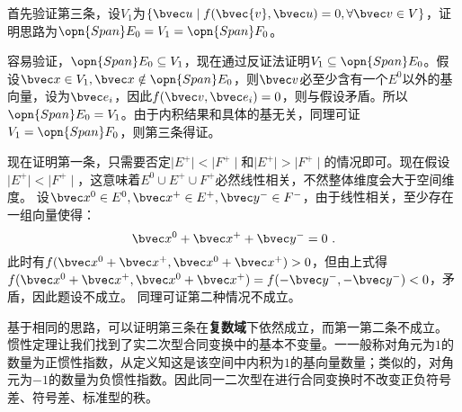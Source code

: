 首先验证第三条，设$V_1$为$\{\bvec u\mid f(\bvec{v},\bvec u)=0,\forall \bvec v\in V\}$，证明思路为$\opn{Span}E_0=V_1=\opn{Span}F_0$。

容易验证，$\opn{Span}E_0\subseteq V_1$，现在通过反证法证明$ V_1\subseteq \opn{Span}E_0$。假设$\bvec x\in V_1,\bvec x\notin \opn{Span}E_0$，则$\bvec v$必至少含有一个$E^0$以外的基向量，设为$\bvec e_i$，因此$f(\bvec v,\bvec e_i)=0$，则与假设矛盾。所以$\opn{Span}E_0=V_1$。由于内积结果和具体的基无关，同理可证$V_1=\opn{Span}F_0$，则第三条得证。

现在证明第一条，只需要否定$\mid E^{+}\mid<\mid F^{+}\mid$和$\mid E^{+}\mid>\mid F^{+}\mid$的情况即可。现在假设$\mid E^{+}\mid<\mid F^{+}\mid$，这意味着$E^0\cup E^{+} \cup F^{+}$必然线性相关，不然整体维度会大于空间维度。
设$\bvec x^0\in E^0,\bvec x^+\in E^{+},\bvec y^{-}\in F^{-}$，由于线性相关，至少存在一组向量使得：
\begin{equation}
\bvec x^0+\bvec x^{+}+\bvec y^{-}=0~.
\end{equation}
此时有$f(\bvec x^0+\bvec x^{+},\bvec x^0+\bvec x^{+})> 0$，但由上式得$f(\bvec x^0+\bvec x^{+},\bvec x^0+\bvec x^{+})=f(-\bvec y^{-},-\bvec y^{-})< 0$，矛盾，因此题设不成立。
同理可证第二种情况不成立。

基于相同的思路，可以证明第三条在\textbf{复数域}下依然成立，而第一第二条不成立。
惯性定理让我们找到了实二次型合同变换中的基本不变量。一一般称对角元为$1$的数量为正惯性指数，从定义知这是该空间中内积为$1$的基向量数量；类似的，对角元为$-1$的数量为负惯性指数。因此同一二次型在进行合同变换时不改变正负符号差、符号差、标准型的秩。

